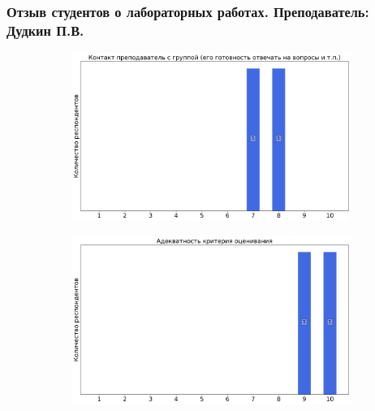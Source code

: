     \subsubsection{Отзыв студентов о лабораторных работах. Преподаватель: Дудкин П.В.}
		\begin{figure}[H]
			\centering
			\begin{subfigure}[b]{0.45\textwidth}
				\centering
				\includegraphics[width=\textwidth]{images/2 course/Радиотехнические цепи и сигналы/labniks-marks-Дудкин П.В.-0.png}
			\end{subfigure}
			\begin{subfigure}[b]{0.45\textwidth}
				\centering
				\includegraphics[width=\textwidth]{images/2 course/Радиотехнические цепи и сигналы/labniks-marks-Дудкин П.В.-1.png}
			\end{subfigure}
			\begin{subfigure}[b]{0.45\textwidth}
				\centering

\end{subfigure}
\end{figure}
